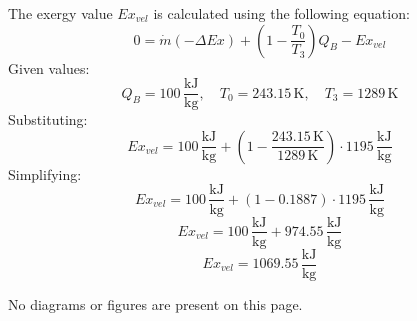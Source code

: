 The exergy value \( Ex_{vel} \) is calculated using the following equation:  
\[
0 = \dot{m} (-\Delta Ex) + \left( 1 - \frac{T_0}{T_3} \right) Q_B - Ex_{vel}
\]  
Given values:  
\[
Q_B = 100 \, \frac{\text{kJ}}{\text{kg}}, \quad T_0 = 243.15 \, \text{K}, \quad T_3 = 1289 \, \text{K}
\]  
Substituting:  
\[
Ex_{vel} = 100 \, \frac{\text{kJ}}{\text{kg}} + \left( 1 - \frac{243.15 \, \text{K}}{1289 \, \text{K}} \right) \cdot 1195 \, \frac{\text{kJ}}{\text{kg}}
\]  
Simplifying:  
\[
Ex_{vel} = 100 \, \frac{\text{kJ}}{\text{kg}} + \left( 1 - 0.1887 \right) \cdot 1195 \, \frac{\text{kJ}}{\text{kg}}
\]  
\[
Ex_{vel} = 100 \, \frac{\text{kJ}}{\text{kg}} + 974.55 \, \frac{\text{kJ}}{\text{kg}}
\]  
\[
Ex_{vel} = 1069.55 \, \frac{\text{kJ}}{\text{kg}}
\]  

No diagrams or figures are present on this page.